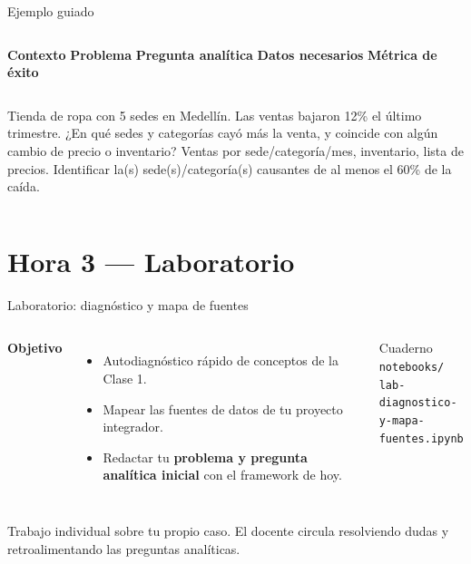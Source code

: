\documentclass[aspectratio=169,11pt]{beamer}
\begin{document}
\begin{frame}{Ejemplo guiado}
  \begin{columns}[T,onlytextwidth]
    \small\textbf{Contexto}
    \small\textbf{Problema}
    \small\textbf{Pregunta analítica}
    \small\textbf{Datos necesarios}
    \small\textbf{Métrica de éxito}
  \end{columns}
  \vspace{0.15cm}
  \begin{columns}[T,onlytextwidth]
    \tiny Tienda de ropa con 5 sedes en Medellín.
    \tiny Las ventas bajaron 12\% el último trimestre.
    \tiny ¿En qué sedes y categorías cayó más la venta, y coincide con algún cambio de precio o inventario?
    \tiny Ventas por sede/categoría/mes, inventario, lista de precios.
    \tiny Identificar la(s) sede(s)/categoría(s) causantes de al menos el 60\% de la caída.
  \end{columns}
\end{frame}

\section{Hora 3 — Laboratorio}
\begin{frame}{Laboratorio: diagnóstico y mapa de fuentes}
  \begin{columns}[T,onlytextwidth]
    \textbf{Objetivo}
    \begin{itemize}
      \small
      \item Autodiagnóstico rápido de conceptos de la Clase 1.
      \item Mapear las fuentes de datos de tu proyecto integrador.
      \item Redactar tu \textbf{problema y pregunta analítica inicial}
        con el framework de hoy.
    \end{itemize}
    \begin{exampleblock}{Cuaderno}
      \small \texttt{notebooks/}\\ \texttt{lab-diagnostico-y-mapa-}\\\texttt{fuentes.ipynb}
    \end{exampleblock}
  \end{columns}
  \vspace{0.3cm}
  \small Trabajo individual sobre tu propio caso. El docente circula
  resolviendo dudas y retroalimentando las preguntas analíticas.
\end{frame}
\end{document}
